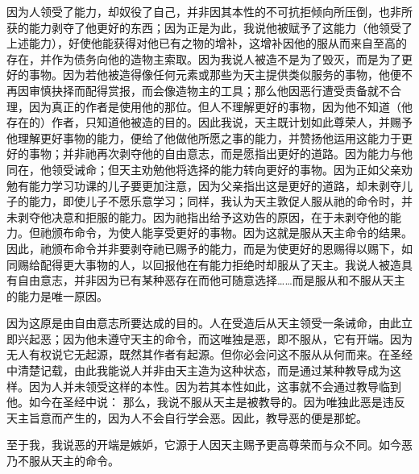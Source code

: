 因为人领受了能力，却奴役了自己，并非因其本性的不可抗拒倾向所压倒，也非所获的能力剥夺了他更好的东西；因为正是为此，我说他被赋予了这能力（他领受了上述能力），好使他能获得对他已有之物的增补，这增补因他的服从而来自至高的存在，并作为债务向他的造物主索取。因为我说人被造不是为了毁灭，而是为了更好的事物。因为若他被造得像任何元素或那些为天主提供类似服务的事物，他便不再因审慎抉择而配得赏报，而会像造物主的工具；那么他因恶行遭受责备就不合理，因为真正的作者是使用他的那位。但人不理解更好的事物，因为他不知道（他存在的）作者，只知道他被造的目的。因此我说，天主既计划如此尊荣人，并赐予他理解更好事物的能力，便给了他做他所愿之事的能力，并赞扬他运用这能力于更好的事物；并非祂再次剥夺他的自由意志，而是愿指出更好的道路。因为能力与他同在，他领受诫命；但天主劝勉他将选择的能力转向更好的事物。因为正如父亲劝勉有能力学习功课的儿子要更加注意，因为父亲指出这是更好的道路，却未剥夺儿子的能力，即使儿子不愿乐意学习；同样，我认为天主敦促人服从祂的命令时，并未剥夺他决意和拒服的能力。因为祂指出给予这劝告的原因，在于未剥夺他的能力。但祂颁布命令，为使人能享受更好的事物。因为这就是服从天主命令的结果。因此，祂颁布命令并非要剥夺祂已赐予的能力，而是为使更好的恩赐得以赐下，如同赐给配得更大事物的人，以回报他在有能力拒绝时却服从了天主。我说人被造具有自由意志，并非因为已有某种恶存在而他可随意选择……而是服从和不服从天主的能力是唯一原因。\par

因为这原是由自由意志所要达成的目的。人在受造后从天主领受一条诫命，由此立即兴起恶；因为他未遵守天主的命令，而这唯独是恶，即不服从，它有开端。因为无人有权说它无起源，既然其作者有起源。但你必会问这不服从从何而来。在圣经中清楚记载，由此我能说人并非由天主造为这种状态，而是通过某种教导成为这样。因为人并未领受这样的本性。因为若其本性如此，这事就不会通过教导临到他。如今在圣经中说： 那么，我说不服从天主是被教导的。因为唯独此恶是违反天主旨意而产生的，因为人不会自行学会恶。因此，教导恶的便是那蛇。\par

至于我，我说恶的开端是嫉妒，它源于人因天主赐予更高尊荣而与众不同。如今恶乃不服从天主的命令。\par

